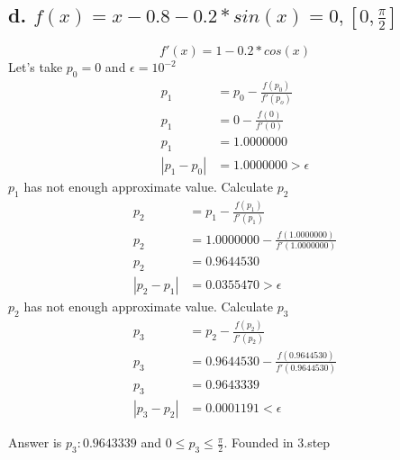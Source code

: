 \documentclass{article}
\begin{document}
\subsection{d. $f(x)=x-0.8-0.2*sin(x) = 0, [0,\frac{\pi}{2}]$}
\begin{equation}
f'(x)=1-0.2*cos(x)
\end{equation}
Let's take $p_0=0$ and $\epsilon=10^{-2}$
\begin{align}
\label{2.3.5.d.1}p_1 & = p_0 - \frac{f(p_0)}{f'(p_o)}\\
\label{2.3.5.d.2}p_1 & = 0 - \frac{f(0)}{f'(0)}\\
\label{2.3.5.d.3}p_1 & = 1.0000000\\
\label{2.3.5.d.4}|p_1-p_0| & =1.0000000 > \epsilon
\end{align}
$p_1$ has not enough approximate value. Calculate $p_2$
\begin{align}
\label{2.3.5.d.1}p_2 & = p_1 - \frac{f(p_1)}{f'(p_1)}\\
\label{2.3.5.d.2}p_2 & = 1.0000000 - \frac{f(1.0000000)}{f'(1.0000000)}\\
\label{2.3.5.d.3}p_2 & = 0.9644530\\
\label{2.3.5.d.4}|p_2-p_1| & =0.0355470 > \epsilon
\end{align}
$p_2$ has not enough approximate value. Calculate $p_3$
\begin{align}
\label{2.3.5.d.1}p_3 & = p_2 - \frac{f(p_2)}{f'(p_2)}\\
\label{2.3.5.d.2}p_3 & = 0.9644530 - \frac{f(0.9644530)}{f'(0.9644530)}\\
\label{2.3.5.d.3}p_3 & = 0.9643339\\
\label{2.3.5.d.4}|p_3-p_2| & =0.0001191 < \epsilon
\end{align}

Answer is $p_3:0.9643339$ and $0\leq p_3 \leq \frac{\pi}{2}$. Founded in 3.step
\end{document}
